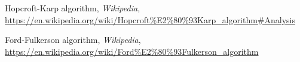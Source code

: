 \documentclass{article}
\begin{document}
\begin{thebibliography}{9}
    
    Hopcroft-Karp algorithm, \emph{Wikipedia}, \url{https://en.wikipedia.org/wiki/Hopcroft%E2%80%93Karp_algorithm#Analysis}
    
    Ford-Fulkerson algorithm, \emph{Wikipedia}, \url{https://en.wikipedia.org/wiki/Ford%E2%80%93Fulkerson_algorithm}

    
    
    \end{thebibliography}
\end{document}
